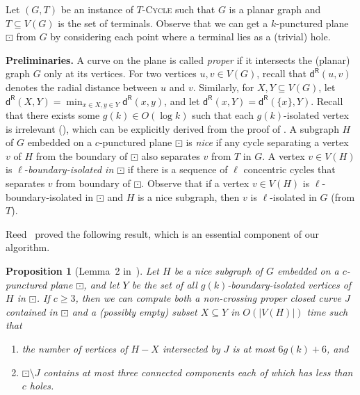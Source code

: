 \documentclass{article}
\newtheorem{proposition}[theorem]{Proposition}
\numberwithin{claimcounter}{lemma}
\newcommand{\tcycle}{$T$-\textsc{Cycle}\xspace}
\begin{document}
Let $(G,T)$ be an instance of \tcycle such that $G$ is a planar graph and $T\subseteq V(G)$ is the set of terminals. Observe that we can get a $k$-punctured plane $\boxdot$ from $G$ by considering each point where a terminal lies as a (trivial) hole.  



\medskip
\noindent\textbf{Preliminaries.} A curve on the plane is called \textit{proper} if it intersects the (planar) graph $G$ only at its vertices. For two vertices $u,v \in V(G)$, recall that $\mathsf{d^R}(u,v)$ denotes the radial distance between $u$ and $v$.
Similarly, for $X,Y \subseteq V(G)$, let $\mathsf{d^R}(X,Y) = \min_{x\in X, y\in Y} \mathsf{d^R}(x,y)$, and let $\mathsf{d^R}(x,Y)= \mathsf{d^R}(\{x\},Y)$. 
Recall that there exists some $g(k) \in O(\log k)$ such that each $g(k)$-isolated vertex  is irrelevant (), which can be explicitly derived from the proof of . A subgraph $H$ of $G$ embedded on a $c$-punctured plane $\boxdot$ is \textit{nice} if any cycle  separating a vertex $v$ of $H$ from the boundary of $\boxdot$ also separates $v$ from $T$ in $G$.
A vertex $v\in V(H)$ is $\ell$-{\em boundary-isolated in $\boxdot$} if there is a sequence of $\ell$ concentric cycles that separates $v$ from boundary of $\boxdot$.  Observe that if a vertex $v\in V(H)$  is $\ell$-boundary-isolated in $\boxdot$ and $H$ is a nice subgraph, then $v$ is $\ell$-isolated in $G$ (from $T$). 



Reed~\cite{reedLinear} proved the following result, which is an essential component of our algorithm.
\begin{proposition}[Lemma~2 in~\cite{reedLinear}]\label{P:reed}
Let $H$ be a nice subgraph of $G$ embedded on a $c$-punctured plane $\boxdot$, and let $Y$ be the set of all $g(k)$-boundary-isolated vertices of $H$ in $\boxdot$. If $c\geq3$, then we can compute both a non-crossing proper closed curve $J$ contained in $\boxdot$ and a (possibly empty) subset $X\subseteq Y$ in $O(|V(H)|)$ time such that
    \begin{enumerate}
        \item the number of vertices of $H-X$ intersected by $J$ is at most $6g(k)+6$, and
        \item $\boxdot \setminus J$ contains at most three connected components each of which has less than $c$ holes.  
    \end{enumerate}
\end{proposition}
\end{document}
